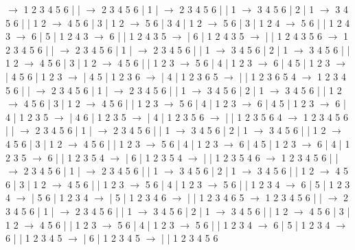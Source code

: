 \documentclass{article}
\begin{document}
\newline
 $\rightarrow$ 1 2 3 4 5 6 |  |  $\rightarrow$ 2 3 4 5 6 | 1 |  $\rightarrow$ 2 3 4 5 6 |  | 1 $\rightarrow$ 3 4 5 6 | 2 | 1 $\rightarrow$ 3 4 5 6 |  | 1 2 $\rightarrow$ 4 5 6 | 3 | 1 2 $\rightarrow$ 5 6 | 3 4 | 1 2 $\rightarrow$ 5 6 | 3 | 1 2 4 $\rightarrow$ 5 6 |  | 1 2 4 3 $\rightarrow$ 6 | 5 | 1 2 4 3 $\rightarrow$ 6 |  | 1 2 4 3 5 $\rightarrow$  | 6 | 1 2 4 3 5 $\rightarrow$  |  | 1 2 4 3 5 6
\newline
 $\rightarrow$ 1 2 3 4 5 6 |  |  $\rightarrow$ 2 3 4 5 6 | 1 |  $\rightarrow$ 2 3 4 5 6 |  | 1 $\rightarrow$ 3 4 5 6 | 2 | 1 $\rightarrow$ 3 4 5 6 |  | 1 2 $\rightarrow$ 4 5 6 | 3 | 1 2 $\rightarrow$ 4 5 6 |  | 1 2 3 $\rightarrow$ 5 6 | 4 | 1 2 3 $\rightarrow$ 6 | 4 5 | 1 2 3 $\rightarrow$  | 4 5 6 | 1 2 3 $\rightarrow$  | 4 5 | 1 2 3 6 $\rightarrow$  | 4 | 1 2 3 6 5 $\rightarrow$  |  | 1 2 3 6 5 4
\newline
 $\rightarrow$ 1 2 3 4 5 6 |  |  $\rightarrow$ 2 3 4 5 6 | 1 |  $\rightarrow$ 2 3 4 5 6 |  | 1 $\rightarrow$ 3 4 5 6 | 2 | 1 $\rightarrow$ 3 4 5 6 |  | 1 2 $\rightarrow$ 4 5 6 | 3 | 1 2 $\rightarrow$ 4 5 6 |  | 1 2 3 $\rightarrow$ 5 6 | 4 | 1 2 3 $\rightarrow$ 6 | 4 5 | 1 2 3 $\rightarrow$ 6 | 4 | 1 2 3 5 $\rightarrow$  | 4 6 | 1 2 3 5 $\rightarrow$  | 4 | 1 2 3 5 6 $\rightarrow$  |  | 1 2 3 5 6 4
\newline
 $\rightarrow$ 1 2 3 4 5 6 |  |  $\rightarrow$ 2 3 4 5 6 | 1 |  $\rightarrow$ 2 3 4 5 6 |  | 1 $\rightarrow$ 3 4 5 6 | 2 | 1 $\rightarrow$ 3 4 5 6 |  | 1 2 $\rightarrow$ 4 5 6 | 3 | 1 2 $\rightarrow$ 4 5 6 |  | 1 2 3 $\rightarrow$ 5 6 | 4 | 1 2 3 $\rightarrow$ 6 | 4 5 | 1 2 3 $\rightarrow$ 6 | 4 | 1 2 3 5 $\rightarrow$ 6 |  | 1 2 3 5 4 $\rightarrow$  | 6 | 1 2 3 5 4 $\rightarrow$  |  | 1 2 3 5 4 6
\newline
 $\rightarrow$ 1 2 3 4 5 6 |  |  $\rightarrow$ 2 3 4 5 6 | 1 |  $\rightarrow$ 2 3 4 5 6 |  | 1 $\rightarrow$ 3 4 5 6 | 2 | 1 $\rightarrow$ 3 4 5 6 |  | 1 2 $\rightarrow$ 4 5 6 | 3 | 1 2 $\rightarrow$ 4 5 6 |  | 1 2 3 $\rightarrow$ 5 6 | 4 | 1 2 3 $\rightarrow$ 5 6 |  | 1 2 3 4 $\rightarrow$ 6 | 5 | 1 2 3 4 $\rightarrow$  | 5 6 | 1 2 3 4 $\rightarrow$  | 5 | 1 2 3 4 6 $\rightarrow$  |  | 1 2 3 4 6 5
\newline
 $\rightarrow$ 1 2 3 4 5 6 |  |  $\rightarrow$ 2 3 4 5 6 | 1 |  $\rightarrow$ 2 3 4 5 6 |  | 1 $\rightarrow$ 3 4 5 6 | 2 | 1 $\rightarrow$ 3 4 5 6 |  | 1 2 $\rightarrow$ 4 5 6 | 3 | 1 2 $\rightarrow$ 4 5 6 |  | 1 2 3 $\rightarrow$ 5 6 | 4 | 1 2 3 $\rightarrow$ 5 6 |  | 1 2 3 4 $\rightarrow$ 6 | 5 | 1 2 3 4 $\rightarrow$ 6 |  | 1 2 3 4 5 $\rightarrow$  | 6 | 1 2 3 4 5 $\rightarrow$  |  | 1 2 3 4 5 6
\newline
\end{document}
